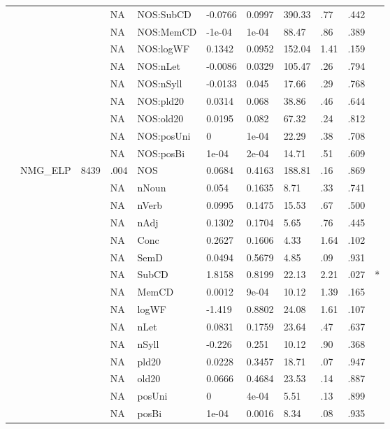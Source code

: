 \begin{table}[ht]
\begin{tabular}{lllllllllll}
   &  &  & NA & NOS:SubCD & -0.0766 & 0.0997 & 390.33 & .77 & .442 &   \\ 
   &  &  & NA & NOS:MemCD & -1e-04 & 1e-04 & 88.47 & .86 & .389 &   \\ 
   &  &  & NA & NOS:logWF & 0.1342 & 0.0952 & 152.04 & 1.41 & .159 &   \\ 
   &  &  & NA & NOS:nLet & -0.0086 & 0.0329 & 105.47 & .26 & .794 &   \\ 
   &  &  & NA & NOS:nSyll & -0.0133 & 0.045 & 17.66 & .29 & .768 &   \\ 
   &  &  & NA & NOS:pld20 & 0.0314 & 0.068 & 38.86 & .46 & .644 &   \\ 
   &  &  & NA & NOS:old20 & 0.0195 & 0.082 & 67.32 & .24 & .812 &   \\ 
   &  &  & NA & NOS:posUni & 0 & 1e-04 & 22.29 & .38 & .708 &   \\ 
   &  &  & NA & NOS:posBi & 1e-04 & 2e-04 & 14.71 & .51 & .609 &   \\ 
   & NMG\_ELP & 8439 & .004 & NOS & 0.0684 & 0.4163 & 188.81 & .16 & .869 &   \\ 
   &  &  & NA & nNoun & 0.054 & 0.1635 & 8.71 & .33 & .741 &   \\ 
   &  &  & NA & nVerb & 0.0995 & 0.1475 & 15.53 & .67 & .500 &   \\ 
   &  &  & NA & nAdj & 0.1302 & 0.1704 & 5.65 & .76 & .445 &   \\ 
   &  &  & NA & Conc & 0.2627 & 0.1606 & 4.33 & 1.64 & .102 &   \\ 
   &  &  & NA & SemD & 0.0494 & 0.5679 & 4.85 & .09 & .931 &   \\ 
   &  &  & NA & SubCD & 1.8158 & 0.8199 & 22.13 & 2.21 & .027 & * \\ 
   &  &  & NA & MemCD & 0.0012 & 9e-04 & 10.12 & 1.39 & .165 &   \\ 
   &  &  & NA & logWF & -1.419 & 0.8802 & 24.08 & 1.61 & .107 &   \\ 
   &  &  & NA & nLet & 0.0831 & 0.1759 & 23.64 & .47 & .637 &   \\ 
   &  &  & NA & nSyll & -0.226 & 0.251 & 10.12 & .90 & .368 &   \\ 
   &  &  & NA & pld20 & 0.0228 & 0.3457 & 18.71 & .07 & .947 &   \\ 
   &  &  & NA & old20 & 0.0666 & 0.4684 & 23.53 & .14 & .887 &   \\ 
   &  &  & NA & posUni & 0 & 4e-04 & 5.51 & .13 & .899 &   \\ 
   &  &  & NA & posBi & 1e-04 & 0.0016 & 8.34 & .08 & .935 &   \\ 

\end{tabular}
\end{table}

